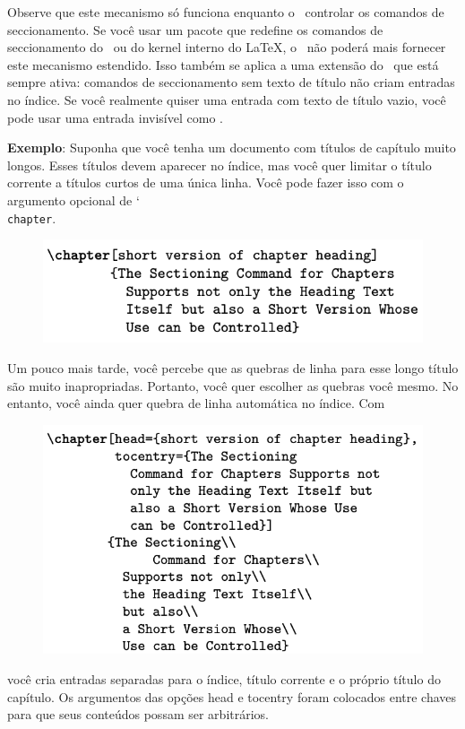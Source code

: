 Observe que este mecanismo só funciona enquanto o \KOMAScript\ controlar os comandos de seccionamento. Se você usar um pacote que redefine os comandos de seccionamento do \KOMAScript\ ou do kernel interno do \LaTeX, o \KOMAScript\ não poderá mais fornecer este mecanismo estendido. Isso também se aplica a uma extensão do \KOMAScript\ que está sempre ativa: comandos de seccionamento sem texto de título não criam entradas no índice. Se você realmente quiser uma entrada com texto de título vazio, você pode usar uma entrada invisível como \mbox{}.

\textbf{Exemplo}: Suponha que você tenha um documento com títulos de capítulo muito longos. Esses títulos devem aparecer no índice, mas você quer limitar o título corrente a títulos curtos de uma única linha. Você pode fazer isso com o argumento opcional de \char`\\\texttt{chap\-ter}.

\begin{figure}[h]
    \centering
    \includegraphics[width=0.60\linewidth]{imagens/imagem14.png}
    \label{fig:img14}
\end{figure}

Um pouco mais tarde, você percebe que as quebras de linha para esse longo título são muito inapropriadas. Portanto, você quer escolher as quebras você mesmo. No entanto, você ainda quer quebra de linha automática no índice. Com
\begin{figure}[h]
    \centering
    \includegraphics[width=0.60\linewidth]{imagens/imagem19.png}
    \label{fig:img19}
\end{figure}

você cria entradas separadas para o índice, título corrente e o próprio título do capítulo. Os argumentos das opções head e tocentry foram colocados entre chaves para que seus conteúdos possam ser arbitrários.

